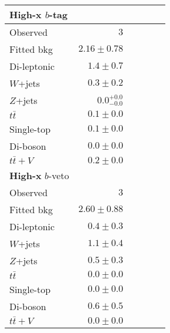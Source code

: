 \documentclass{article}
\begin{document}
\begin{tabular*}{\textwidth}{@{\extracolsep{\fill}}lrrrrr}
\toprule
\textbf{High-x} $b$-tag &  \\
\midrule

Observed          & $3$                    \\
\midrule
Fitted bkg         & $2.16 \pm 0.78$              \\
\midrule
        Di-leptonic         & $1.4 \pm 0.7$              \\
        $W$+jets         & $0.3 \pm 0.2$              \\
        $Z$+jets         & $0.0_{-0.0}^{+0.0}$              \\
        $t\bar{t}$         & $0.1 \pm 0.0$              \\
        Single-top         & $0.1 \pm 0.0$              \\
        Di-boson         & $0.0 \pm 0.0$              \\
        $t\bar{t}+V$         & $0.2 \pm 0.0$              \\
\toprule
\textbf{High-x} $b$-veto &  \\
\midrule
Observed          & $3$                    \\
\midrule
Fitted bkg         & $2.60 \pm 0.88$              \\
\midrule
        Di-leptonic         & $0.4 \pm 0.3$              \\
        $W$+jets         & $1.1 \pm 0.4$              \\
        $Z$+jets         & $0.5 \pm 0.3$              \\
        $t\bar{t}$         & $0.0 \pm 0.0$              \\
        Single-top         & $0.0 \pm 0.0$              \\
        Di-boson         & $0.6 \pm 0.5$              \\
        $t\bar{t}+V$         & $0.0 \pm 0.0$              \\


\bottomrule
\end{tabular*}
\end{document}
